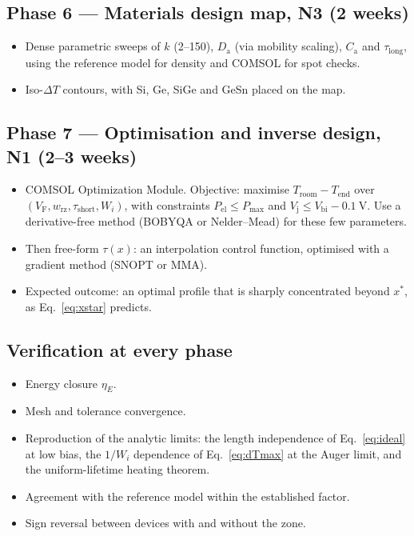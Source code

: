 \documentclass[11pt,a4paper]{article}
\newcommand{\Vj}{V_{\mathrm{j}}}
\newcommand{\VF}{V_{\mathrm{F}}}
\newcommand{\Da}{D_{\mathrm{a}}}
\newcommand{\Ca}{C_{\mathrm{a}}}
\newcommand{\Troom}{T_{\mathrm{room}}}
\begin{document}
\subsection*{Phase 6 --- Materials design map, N3 (2 weeks)}
\begin{itemize}
  \item Dense parametric sweeps of $k$ (2--150), $\Da$ (via mobility scaling), $\Ca$ and $\tau_{\mathrm{long}}$, using the reference model for density and COMSOL for spot checks.
  \item Iso-$\Delta T$ contours, with Si, Ge, SiGe and GeSn placed on the map.
\end{itemize}

\subsection*{Phase 7 --- Optimisation and inverse design, N1 (2--3 weeks)}
\begin{itemize}
  \item COMSOL Optimization Module. Objective: maximise $\Troom-T_{\mathrm{end}}$ over $(\VF,w_{\mathrm{rz}},\tau_{\mathrm{short}},W_i)$, with constraints $P_{\mathrm{el}}\le P_{\max}$ and $\Vj\le V_{\mathrm{bi}}-\SI{0.1}{\volt}$. Use a derivative-free method (BOBYQA or Nelder--Mead) for these few parameters.
  \item Then free-form $\tau(x)$: an interpolation control function, optimised with a gradient method (SNOPT or MMA).
  \item Expected outcome: an optimal profile that is sharply concentrated beyond $x^\ast$, as Eq.~\eqref{eq:xstar} predicts.
\end{itemize}

\subsection*{Verification at every phase}
\begin{itemize}
  \item Energy closure $\eta_E$.
  \item Mesh and tolerance convergence.
  \item Reproduction of the analytic limits: the length independence of Eq.~\eqref{eq:ideal} at low bias, the $1/W_i$ dependence of Eq.~\eqref{eq:dTmax} at the Auger limit, and the uniform-lifetime heating theorem.
  \item Agreement with the reference model within the established factor.
  \item Sign reversal between devices with and without the zone.
\end{itemize}
\end{document}
